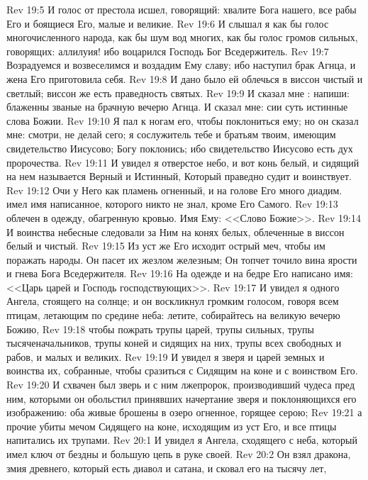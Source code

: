 \vs Rev 19:5 И голос от престола исшел, говорящий: хвалите Бога нашего, все рабы Его и боящиеся Его, малые и великие.
\vs Rev 19:6 И слышал я как бы голос многочисленного народа, как бы шум вод многих, как бы голос громов сильных, говорящих: аллилуия! ибо воцарился Господь Бог Вседержитель.
\vs Rev 19:7 Возрадуемся и возвеселимся и воздадим Ему славу; ибо наступил брак Агнца, и жена Его приготовила себя.
\vs Rev 19:8 И дано было ей облечься в виссон чистый и светлый; виссон же есть праведность святых.
\vs Rev 19:9 И сказал мне : напиши: блаженны званые на брачную вечерю Агнца. И сказал мне: сии суть истинные слова Божии.
\vs Rev 19:10 Я пал к ногам его, чтобы поклониться ему; но он сказал мне: смотри, не делай сего; я сослужитель тебе и братьям твоим, имеющим свидетельство Иисусово; Богу поклонись; ибо свидетельство Иисусово есть дух пророчества.
\rsbpar\vs Rev 19:11 И увидел я отверстое небо, и вот конь белый, и сидящий на нем называется Верный и Истинный, Который праведно судит и воинствует.
\vs Rev 19:12 Очи у Него как пламень огненный, и на голове Его много диадим.  имел имя написанное, которого никто не знал, кроме Его Самого.
\vs Rev 19:13  облечен в одежду, обагренную кровью. Имя Ему: <<Слово Божие>>.
\vs Rev 19:14 И воинства небесные следовали за Ним на конях белых, облеченные в виссон белый и чистый.
\vs Rev 19:15 Из уст же Его исходит острый меч, чтобы им поражать народы. Он пасет их жезлом железным; Он топчет точило вина ярости и гнева Бога Вседержителя.
\vs Rev 19:16 На одежде и на бедре Его написано имя: <<Царь царей и Господь господствующих>>.
\vs Rev 19:17 И увидел я одного Ангела, стоящего на солнце; и он воскликнул громким голосом, говоря всем птицам, летающим по средине неба: летите, собирайтесь на великую вечерю Божию,
\vs Rev 19:18 чтобы пожрать трупы царей, трупы сильных, трупы тысяченачальников, трупы коней и сидящих на них, трупы всех свободных и рабов, и малых и великих.
\rsbpar\vs Rev 19:19 И увидел я зверя и царей земных и воинства их, собранные, чтобы сразиться с Сидящим на коне и с воинством Его.
\vs Rev 19:20 И схвачен был зверь и с ним лжепророк, производивший чудеса пред ним, которыми он обольстил принявших начертание зверя и поклоняющихся его изображению: оба живые брошены в озеро огненное, горящее серою;
\vs Rev 19:21 а прочие убиты мечом Сидящего на коне, исходящим из уст Его, и все птицы напитались их трупами.
\vs Rev 20:1 И увидел я Ангела, сходящего с неба, который имел ключ от бездны и большую цепь в руке своей.
\vs Rev 20:2 Он взял дракона, змия древнего, который есть диавол и сатана, и сковал его на тысячу лет,
